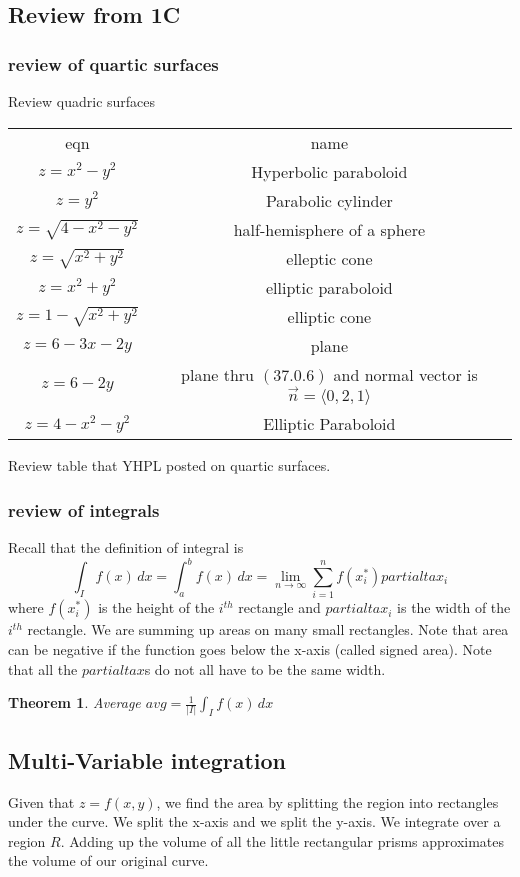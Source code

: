 \documentclass[11pt]{article}
\newtheorem{thm}{Theorem}
\begin{document}
\subsection{Review from 1C}
\subsubsection{review of quartic surfaces}
Review quadric surfaces
\begin{table}[h]
  \centering
  \begin{tabular}{||c c||}
    eqn & name \\
    $z = x^2 - y^ 2$ & Hyperbolic paraboloid \\
    $ z = y^2$ & Parabolic cylinder \\
    $z = \sqrt{4-x^2-y^2}$ & half-hemisphere of a sphere\\
    $z = \sqrt{x^2+y^2}$ & elleptic cone \\
    $ z = x^2 + y^2 $ & elliptic paraboloid \\
    $ z  =1 - \sqrt{x^2 + y^2 } $ & elliptic cone \\
    $ z = 6-3x-2y$ & plane \\
    $ z = 6-2y$ & plane thru $(37.0.6)$ and normal vector is $\vec{n} = \langle 0 ,2 ,1 \rangle$ \\
    $z = 4-x^2-y^2$ &  Elliptic Paraboloid\\
   \end{tabular}
  \end{table}
Review table that YHPL posted on quartic surfaces.
\subsubsection{review of integrals}
Recall that the definition of integral is
\[\int_I f(x) \, dx = \int_a^b f(x) \, dx = \lim_{n \to \infty} \sum_{i=1}^n f(x_i^*) partialta x_i\]
where $f(x_i^*)$ is the height of the $i^{th}$ rectangle and $partialta x_i$ is the width of the
$i^{th}$ rectangle. We are summing up areas on many small rectangles. Note that area can be
negative if the function goes below the x-axis (called signed area).
Note that all the $partialta x$s do not all have to be the same width.

\begin{thm}
  Average
$avg = \frac{1}{|I|} \int_I f(x) \, dx$
\end{thm}
\subsection{Multi-Variable integration}
Given that $z = f(x,y)$, we find the area by splitting the region into rectangles under the
curve. We split the x-axis and we split the y-axis. We integrate over a region $R$.
Adding up the volume of all the little rectangular prisms approximates the volume of
our original curve.
\end{document}
